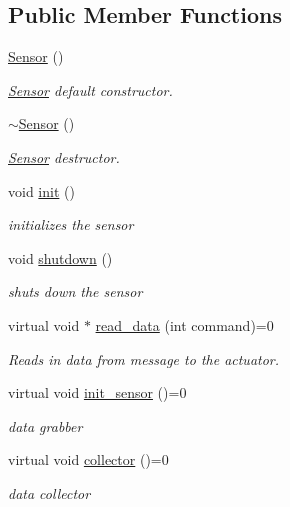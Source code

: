 \subsection*{Public Member Functions}
\begin{DoxyCompactItemize}
\item 
\hyperlink{classSensor_a342d6d11ef572c8cba92cb76fb1a294b}{Sensor} ()
\begin{DoxyCompactList}\small\item\em \hyperlink{classSensor}{Sensor} default constructor. \end{DoxyCompactList}\item 
\hyperlink{classSensor_aee8c70e7ef05ce65e7ee33686b5d7db2}{$\sim$\-Sensor} ()
\begin{DoxyCompactList}\small\item\em \hyperlink{classSensor}{Sensor} destructor. \end{DoxyCompactList}\item 
void \hyperlink{classSensor_a84bc35cfba92eb579bc311b3c8b2980d}{init} ()
\begin{DoxyCompactList}\small\item\em initializes the sensor \end{DoxyCompactList}\item 
void \hyperlink{classSensor_a2f08975182e98e644efb226435124047}{shutdown} ()
\begin{DoxyCompactList}\small\item\em shuts down the sensor \end{DoxyCompactList}\item 
virtual void $\ast$ \hyperlink{classSensor_acf4ff5c6c8f793ed47a8105b94ff7c3e}{read\-\_\-data} (int command)=0
\begin{DoxyCompactList}\small\item\em Reads in data from message to the actuator. \end{DoxyCompactList}\item 
virtual void \hyperlink{classSensor_a11b28f6bc91d6f69e734e13ab0e64f56}{init\-\_\-sensor} ()=0
\begin{DoxyCompactList}\small\item\em data grabber \end{DoxyCompactList}\item 
virtual void \hyperlink{classSensor_ae4ec41b880d44feb898da5c62c3203c9}{collector} ()=0
\begin{DoxyCompactList}\small\item\em data collector \end{DoxyCompactList}\item 

\end{DoxyCompactItemize}
